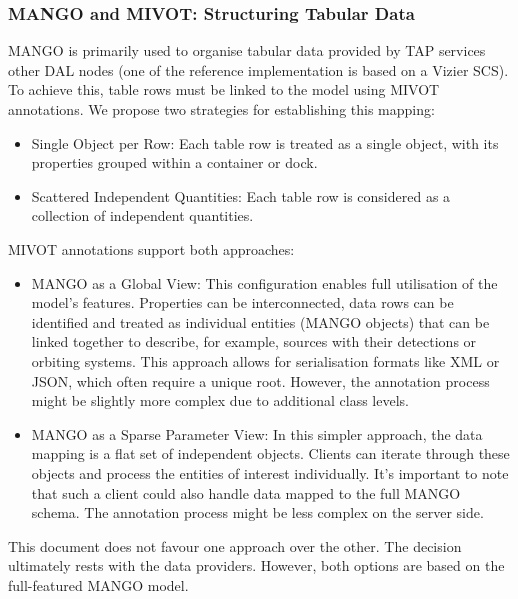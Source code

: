 \documentclass[11pt,a4paper]{ivoa}
\begin{document}
\subsubsection{MANGO and MIVOT: Structuring Tabular Data}

MANGO is primarily used to organise tabular data provided by TAP services \citep{2019ivoa.spec.0927D} 
other DAL nodes (one of the reference implementation is based on a Vizier SCS).
To achieve this, table rows must be linked to the model using MIVOT annotations.
We propose two strategies for establishing this mapping:
\begin{itemize}[noitemsep,topsep=0pt,parsep=0pt,partopsep=0pt]
    \item Single Object per Row: Each table row is treated as a single object,
          with its properties grouped within a container or dock.
    \item Scattered Independent Quantities: Each table row is considered as a collection of independent quantities.
\end{itemize}

MIVOT annotations support both approaches:

\begin{itemize}[noitemsep,topsep=0pt,parsep=0pt,partopsep=0pt]
    \item MANGO as a Global View: This configuration enables full utilisation of the 
          model's features. Properties can be interconnected, data rows can be identified
          and treated as individual entities (MANGO objects) that can be linked together to describe,
          for example, sources with their detections or orbiting systems.
          This approach allows for serialisation formats like XML or JSON, which often require
          a unique root.
          However, the annotation process might be slightly more complex due to additional class levels.
    \item MANGO as a Sparse Parameter View: In this simpler approach, the data mapping is a
          flat set of independent objects. Clients can iterate through these objects and process
          the entities of interest individually.
          It's important to note that such a client could also handle data mapped to the full MANGO schema.
          The annotation process might be less complex on the server side.
\end{itemize}

This document does not favour one approach over the other.
The decision ultimately rests with the data providers.
However, both options are based on the full-featured MANGO model.
\end{document}
